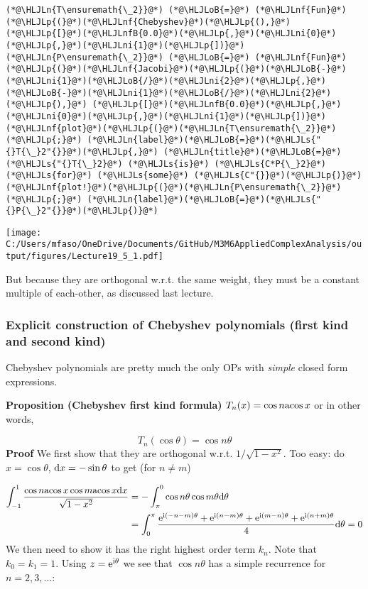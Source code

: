 \documentclass[12pt,landscape]{article}
\newcommand{\HLJLn}[1]{#1}
\newcommand{\HLJLnf}[1]{\textcolor[RGB]{66,102,213}{#1}}
\newcommand{\HLJLs}[1]{\textcolor[RGB]{201,61,57}{#1}}
\newcommand{\HLJLnfB}[1]{\textcolor[RGB]{59,151,46}{#1}}
\newcommand{\HLJLni}[1]{\textcolor[RGB]{59,151,46}{#1}}
\newcommand{\HLJLoB}[1]{\textcolor[RGB]{102,102,102}{\textbf{#1}}}
\newcommand{\HLJLp}[1]{#1}
\def\D{ {\rm d} }
\def\I{ {\rm i} }
\def\E{ {\rm e} }
\def\acos{ {\rm acos}\, }
\def\addtab#1={#1\;&=}
\def\ccr{\\\addtab}
\def\dx{\D x}
\def\addtab#1={#1\;&=}
\def\ccr{\\\addtab}
\begin{document}
{\begin{lstlisting}
(*@\HLJLn{T\ensuremath{\_2}}@*) (*@\HLJLoB{=}@*) (*@\HLJLnf{Fun}@*)(*@\HLJLp{(}@*)(*@\HLJLnf{Chebyshev}@*)(*@\HLJLp{(),}@*) (*@\HLJLp{[}@*)(*@\HLJLnfB{0.0}@*)(*@\HLJLp{,}@*)(*@\HLJLni{0}@*)(*@\HLJLp{,}@*)(*@\HLJLni{1}@*)(*@\HLJLp{])}@*)
(*@\HLJLn{P\ensuremath{\_2}}@*) (*@\HLJLoB{=}@*) (*@\HLJLnf{Fun}@*)(*@\HLJLp{(}@*)(*@\HLJLnf{Jacobi}@*)(*@\HLJLp{(}@*)(*@\HLJLoB{-}@*)(*@\HLJLni{1}@*)(*@\HLJLoB{/}@*)(*@\HLJLni{2}@*)(*@\HLJLp{,}@*)(*@\HLJLoB{-}@*)(*@\HLJLni{1}@*)(*@\HLJLoB{/}@*)(*@\HLJLni{2}@*)(*@\HLJLp{),}@*) (*@\HLJLp{[}@*)(*@\HLJLnfB{0.0}@*)(*@\HLJLp{,}@*)(*@\HLJLni{0}@*)(*@\HLJLp{,}@*)(*@\HLJLni{1}@*)(*@\HLJLp{])}@*)
(*@\HLJLnf{plot}@*)(*@\HLJLp{(}@*)(*@\HLJLn{T\ensuremath{\_2}}@*)(*@\HLJLp{;}@*) (*@\HLJLn{label}@*)(*@\HLJLoB{=}@*)(*@\HLJLs{"{}T{\_}2"{}}@*)(*@\HLJLp{,}@*) (*@\HLJLn{title}@*)(*@\HLJLoB{=}@*)(*@\HLJLs{"{}T{\_}2}@*) (*@\HLJLs{is}@*) (*@\HLJLs{C*P{\_}2}@*) (*@\HLJLs{for}@*) (*@\HLJLs{some}@*) (*@\HLJLs{C"{}}@*)(*@\HLJLp{)}@*)
(*@\HLJLnf{plot!}@*)(*@\HLJLp{(}@*)(*@\HLJLn{P\ensuremath{\_2}}@*)(*@\HLJLp{;}@*) (*@\HLJLn{label}@*)(*@\HLJLoB{=}@*)(*@\HLJLs{"{}P{\_}2"{}}@*)(*@\HLJLp{)}@*)
\end{lstlisting}

\texttt{[image: C:/Users/mfaso/OneDrive/Documents/GitHub/M3M6AppliedComplexAnalysis/output/figures/Lecture19\_5\_1.pdf]}

But because they are orthogonal w.r.t. the same weight, they must be a constant multiple of each-other, as discussed last lecture.

\subsubsection{Explicit construction of Chebyshev polynomials (first kind and second kind)}
Chebyshev polynomials are pretty much the only OPs with \emph{simple} closed form expressions.

\textbf{Proposition (Chebyshev first kind formula)} $T_n(x) = \cos n \acos x$ or in other words,

\[
T_n(\cos \theta) = \cos n \theta
\]
\textbf{Proof} We first show that they are orthogonal w.r.t. $1/\sqrt{1-x^2}$. Too easy: do $x = \cos \theta$, $\dx = -\sin \theta$ to get (for $n \neq m$)


\begin{align*}
    \int_{-1}^1 {\cos n \acos x \cos m \acos x \dx \over \sqrt{1-x^2}} &= -\int_\pi^0  \cos n \theta \cos m \theta \D \theta \ccr
    =  \int_0^\pi  {\E^{\I (-n-m)\theta} + \E^{\I (n-m)\theta} + \E^{\I (m-n)\theta} + \E^{\I (n+m)\theta}    \over 4} \D \theta =0
\end{align*}
\newpage
We then need to show it has the right highest order term $k_n$. Note that $k_0 = k_1 = 1$.  Using $z = \E^{\I \theta}$ we see that $\cos n \theta$ has a simple recurrence for $n=2,3,\ldots$:

}
\end{document}
